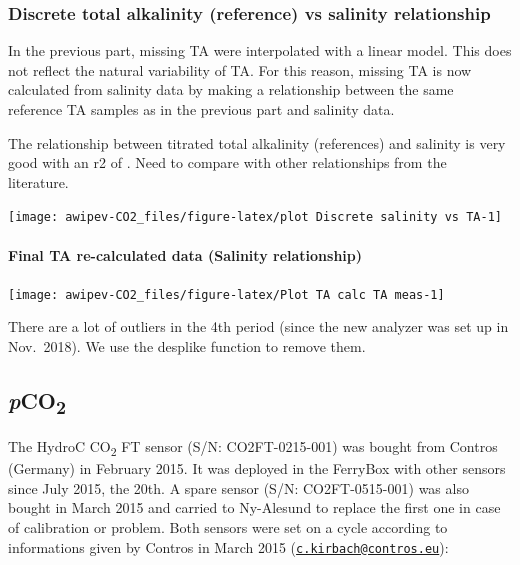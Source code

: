 \documentclass[
]{article}
\begin{document}
\hypertarget{discrete-total-alkalinity-reference-vs-salinity-relationship}{%
\subsubsection{\texorpdfstring{\textbf{Discrete total alkalinity
(reference) vs salinity
relationship}}{Discrete total alkalinity (reference) vs salinity relationship}}\label{discrete-total-alkalinity-reference-vs-salinity-relationship}}

In the previous part, missing TA were interpolated with a linear model.
This does not reflect the natural variability of TA. For this reason,
missing TA is now calculated from salinity data by making a relationship
between the same reference TA samples as in the previous part and
salinity data.

The relationship between titrated total alkalinity (references) and
salinity is very good with an r2 of . Need to compare with other
relationships from the literature.

\begin{center}\texttt{[image: awipev-CO2\_files/figure-latex/plot Discrete salinity vs TA-1]} \end{center}

\hypertarget{final-ta-re-calculated-data-salinity-relationship}{%
\paragraph{\texorpdfstring{\textbf{Final TA re-calculated data (Salinity
relationship)}}{Final TA re-calculated data (Salinity relationship)}}\label{final-ta-re-calculated-data-salinity-relationship}}

\texttt{[image: awipev-CO2\_files/figure-latex/Plot TA calc TA meas-1]}

There are a lot of outliers in the 4th period (since the new analyzer
was set up in Nov.~2018). We use the desplike function to remove them.

\hypertarget{pco2}{%
\subsection{\texorpdfstring{\emph{p}CO\textsubscript{2}}{pCO2}}\label{pco2}}

The HydroC CO\textsubscript{2} FT sensor (S/N: CO2FT-0215-001) was
bought from Contros (Germany) in February 2015. It was deployed in the
FerryBox with other sensors since July 2015, the 20th. A spare sensor
(S/N: CO2FT-0515-001) was also bought in March 2015 and carried to
Ny-Alesund to replace the first one in case of calibration or problem.
Both sensors were set on a cycle according to informations given by
Contros in March 2015
(\href{mailto:c.kirbach@contros.eu}{\nolinkurl{c.kirbach@contros.eu}}):
\end{document}

